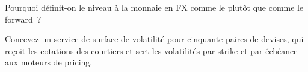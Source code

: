 \begin{interviewq}\label{iq:m2:the-fx-options-market:5}
Pourquoi définit-on le niveau à la monnaie en FX comme le  plutôt que
comme le forward~?
\end{interviewq}

\begin{interviewq}\label{iq:m2:the-fx-options-market:6}
Concevez un service de surface de volatilité pour cinquante paires de devises, qui reçoit les
cotations des courtiers et sert les volatilités par strike et par échéance aux moteurs de pricing.
\end{interviewq}
